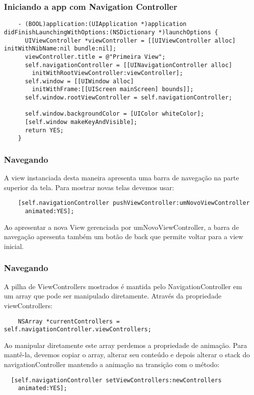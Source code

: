 \documentclass[serif,mathserif]{beamer}
\begin{document}
\begin{frame}[fragile]
  \frametitle{Iniciando a app com Navigation Controller}
  \begin{lstlisting}
    - (BOOL)application:(UIApplication *)application didFinishLaunchingWithOptions:(NSDictionary *)launchOptions {
      UIViewController *viewController = [[UIViewController alloc] initWithNibName:nil bundle:nil];
      viewController.title = @"Primeira View";    
      self.navigationController = [[UINavigationController alloc]
        initWithRootViewController:viewController];
      self.window = [[UIWindow alloc]
        initWithFrame:[[UIScreen mainScreen] bounds]];
      self.window.rootViewController = self.navigationController;

      self.window.backgroundColor = [UIColor whiteColor];
      [self.window makeKeyAndVisible];
      return YES;
    }
  \end{lstlisting}
\end{frame}

\begin{frame}[fragile]
  \frametitle{Navegando}
  A view instanciada desta maneira apresenta uma barra de navegação na parte superior da
  tela. Para mostrar novas telas devemos usar:
  \begin{lstlisting}
    [self.navigationController pushViewController:umNovoViewController
      animated:YES];  
  \end{lstlisting}
  Ao apresentar a nova View gerenciada por umNovoViewController, a barra de navegação apresenta também um botão de back que permite voltar para a view inicial.
\end{frame}  

  \begin{frame}[fragile]
    \frametitle{Navegando}
  A pilha de ViewControllers mostrados é mantida pelo NavigationController em um array que pode ser manipulado diretamente. Através da propriedade viewControllers:
  \begin{lstlisting}
    NSArray *currentControllers = self.navigationController.viewControllers;
  \end{lstlisting}
  Ao manipular diretamente este array perdemos a propriedade de animação. Para mantê-la, devemos
  copiar o array, alterar seu conteúdo e depois alterar o stack do navigationController mantendo a animação na transição com o método:
  \begin{lstlisting}
  [self.navigationController setViewControllers:newControllers
    animated:YES];
  \end{lstlisting}  
\end{frame}
\end{document}
